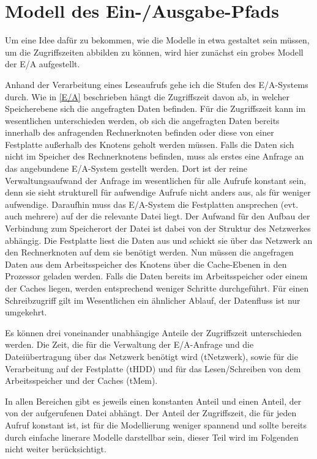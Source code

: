 \documentclass[
	12pt,
	a4paper,
	BCOR10mm,
	DIV14,
	listof=totoc,
	bibliography=totoc,
	headsepline
]{scrreprt}
\begin{document}
\section{Modell des Ein-/Ausgabe-Pfads}
\label{ea_modell}
Um eine Idee dafür zu bekommen, wie die Modelle in etwa gestaltet sein müssen, um die Zugriffszeiten abbilden zu können, wird hier zunächst ein grobes Modell der E/A aufgestellt.

Anhand der Verarbeitung eines Leseaufrufs gehe ich die Stufen des E/A-Systems durch. Wie in \ref{E/A} beschrieben hängt die Zugriffszeit davon ab, in welcher Speicherebene sich die angefragten Daten befinden.
Für die Zugriffszeit kann im wesentlichen unterschieden werden, ob sich die angefragten Daten bereits innerhalb des anfragenden Rechnerknoten befinden oder diese von einer Festplatte außerhalb des Knotens geholt werden müssen.
Falls die Daten sich nicht im Speicher des Rechnerknotens befinden, muss als erstes eine Anfrage an das angebundene E/A-System gestellt werden.
Dort ist der reine Verwaltungsaufwand der Anfrage im wesentlichen für alle Aufrufe konstant sein, denn sie sieht strukturell für aufwendige Aufrufe nicht anders aus, als für weniger aufwendige.
Daraufhin muss das E/A-System die Festplatten ansprechen (evt. auch mehrere) auf der die relevante Datei liegt. Der Aufwand für den Aufbau der Verbindung zum Speicherort der Datei ist dabei von der Struktur des Netzwerkes abhängig. Die Festplatte liest die Daten aus und schickt sie über das Netzwerk an den Rechnerknoten auf dem sie benötigt werden.
Nun müssen die angefragen Daten aus dem Arbeitsspeicher des Knotens über die Cache-Ebenen in den Prozessor geladen werden. 
Falls die Daten bereits im Arbeitsspeicher oder einem der Caches liegen, werden entsprechend weniger Schritte durchgeführt.
Für einen Schreibzugriff gilt im Wesentlichen ein ähnlicher Ablauf, der Datenfluss ist nur umgekehrt.

Es können drei voneinander unabhängige Anteile der Zugriffszeit unterschieden werden. Die Zeit, die für die Verwaltung der E/A-Anfrage und die Dateiübertragung über das Netzwerk benötigt wird (tNetzwerk), sowie für die Verarbeitung auf der Festplatte (tHDD) und für das Lesen/Schreiben von dem Arbeitsspeicher und der Caches (tMem).

In allen Bereichen gibt es jeweils einen konstanten Anteil und einen Anteil, der von der aufgerufenen Datei abhängt. 
Der Anteil der Zugriffszeit, die für jeden Aufruf konstant ist, ist für die Modellierung weniger spannend und sollte bereits durch einfache linerare Modelle darstellbar sein, dieser Teil wird im Folgenden nicht weiter berücksichtigt.
\end{document}
